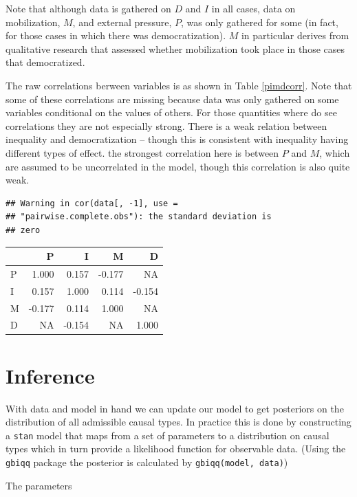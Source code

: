 \documentclass[12pt,]{book}
\begin{document}
Note that although data is gathered on \(D\) and \(I\) in all cases, data on mobilization, \(M\), and external pressure, \(P\), was only gathered for some (in fact, for those cases in which there was democratization). \(M\) in particular derives from qualitative research that assessed whether mobilization took place in those cases that democratized.

The raw correlations berween variables is as shown in Table \ref{pimdcorr}. Note that some of these correlations are missing because data was only gathered on some variables conditional on the values of others. For those quantities where do see correlations they are not especially strong. There is a weak relation between inequality and democratization -- though this is consistent with inequality having different types of effect. the strongest correlation here is between \(P\) and \(M\), which are assumed to be uncorrelated in the model, though this correlation is also quite weak.

\begin{verbatim}
## Warning in cor(data[, -1], use =
## "pairwise.complete.obs"): the standard deviation is
## zero
\end{verbatim}

\begin{tabular}{l|r|r|r|r}
\hline
  & P & I & M & D\\
\hline
P & 1.000 & 0.157 & -0.177 & NA\\
\hline
I & 0.157 & 1.000 & 0.114 & -0.154\\
\hline
M & -0.177 & 0.114 & 1.000 & NA\\
\hline
D & NA & -0.154 & NA & 1.000\\
\hline
\end{tabular}

\hypertarget{inference}{%
\section{Inference}\label{inference}}

With data and model in hand we can update our model to get posteriors on the distribution of all admissible causal types. In practice this is done by constructing a \texttt{stan} model that maps from a set of parameters to a distribution on causal types which in turn provide a likelihood function for observable data. (Using the \texttt{gbiqq} package the posterior is calculated by \texttt{gbiqq(model,\ data)})

The parameters
\end{document}
